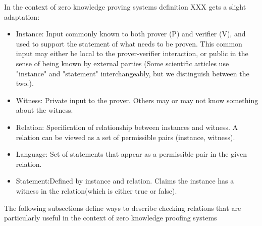 In the context of zero knowledge proving systems definition XXX gets a slight adaptation:
\begin{itemize}
\item Instance: Input commonly known to both prover (P) and verifier (V), and used to support the statement of what needs to be proven. This common input may either be local to the prover-verifier interaction, or public in the sense of being known by external parties (Some scientific articles use "instance" and "statement" interchangeably, but we distinguish between the two.).
\item Witness: Private input to the prover. Others may or may not know something about the witness.
\item Relation: Specification of relationship between instances and witness. A relation can be viewed as a set of permissible pairs (instance, witness).
\item Language: Set of statements that appear as a permissible pair in the given relation.
\item Statement:Defined by instance and relation. Claims the instance has a witness in the relation(which is either true or false).
\end{itemize}

The following subsections define ways to describe checking relations that are particularly useful in the context of zero knowledge proofing systems
